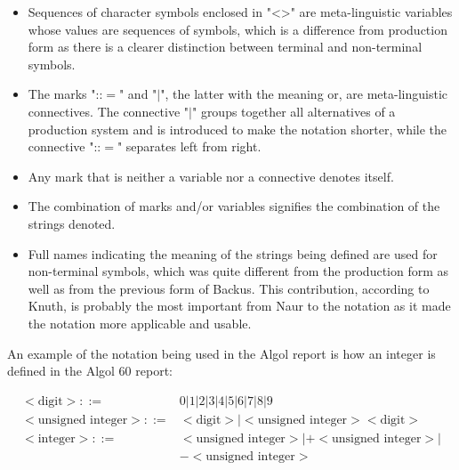 \documentclass{article}
\begin{document}
\begin{itemize}
	\item Sequences of character symbols enclosed in "<>" are meta-linguistic variables whose values are sequences of symbols, which is a difference from production form as there is a clearer distinction between terminal and non-terminal symbols.
	\item The marks "::$=$" and "$|$", the latter with the meaning or, are meta-linguistic connectives. The connective "$|$" groups together all alternatives of a production system and is introduced to make the notation shorter, while the connective "::$=$" separates left from right.
	\item Any mark that is neither a variable nor a connective denotes itself.
	\item The combination of marks and/or variables signifies the combination of the strings denoted.
	\item Full names indicating the meaning of the strings being defined are used for non-terminal symbols, which was quite different from the production form as well as from the previous form of Backus. This contribution, according to Knuth, is probably the most important from Naur to the notation as it made the notation more applicable and usable.
\end{itemize}

An example of the notation being used in the Algol report is how an integer is defined in the Algol 60 report:

\begin{equation} \label{eq3}
	\begin{split}
	<\text{digit}> ::=&0|1|2|3|4|5|6|7|8|9 \\
	<\text{unsigned integer}> ::=&<\text{digit}>|<\text{unsigned integer}><\text{digit}> \\
	<\text{integer}> ::=&<\text{unsigned integer}>|+<\text{unsigned integer}>|\\&-<\text{unsigned integer}>
	\end{split}
\end{equation}
\end{document}

